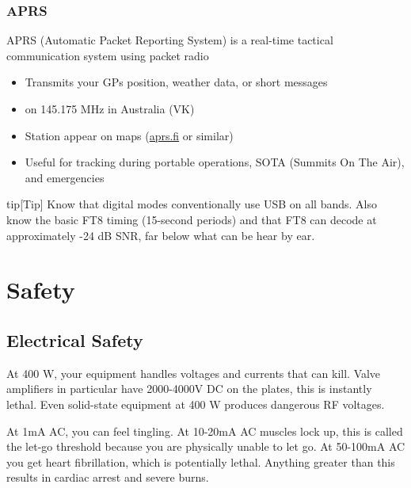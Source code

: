\documentclass{article}
\begin{document}
\subsubsection{APRS}
APRS (Automatic Packet Reporting System) is a real-time tactical communication system using packet radio
\begin{itemize}
    \item Transmits your GPs position, weather data, or short messages
    \item on 145.175 MHz in Australia (VK)
    \item Station appear on maps (\url{aprs.fi} or similar)
    \item Useful for tracking during portable operations, SOTA (Summits On The Air), and emergencies
\end{itemize}

\begin{callout}{tip}[Tip]
    Know that digital modes conventionally use USB on all bands. Also know the basic FT8 timing (15-second periods) and that FT8 can decode at approximately -24 dB SNR, far below what can be hear by ear.
\end{callout}

\section{Safety}
\subsection{Electrical Safety}
At 400 W, your equipment handles voltages and currents that can kill. Valve amplifiers in particular have 2000-4000V DC on the plates, this is instantly lethal. Even solid-state equipment at 400 W produces dangerous RF voltages.

At 1mA AC, you can feel tingling. At 10-20mA AC muscles lock up, this is called the let-go threshold because you are physically unable to let go. At 50-100mA AC you get heart fibrillation, which is potentially lethal. Anything greater than this results in cardiac arrest and severe burns.
\end{document}
